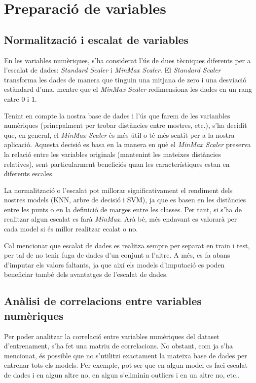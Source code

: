 \section{Preparació de variables}

\subsection{Normalització i escalat de variables}
En les variables numèriques, s'ha considerat l'ús de dues tècniques diferents per a l'escalat de dades: \textit{Standard Scaler} i \textit{MinMax Scaler}. El \textit{Standard Scaler} transforma les dades de manera que tinguin una mitjana de zero i una desviació estàndard d'una, mentre que el \textit{MinMax Scaler} redimensiona les dades en un rang entre 0 i 1.

Tenint en compte la nostra base de dades i l'ús que farem de les varianbles numèriques (princpalment per trobar distàncies entre mostres, etc.), s'ha decidit que, en general, el \textit{MinMax Scaler} és més útil o té més sentit per a la nostra aplicació. Aquesta decisió es basa en la manera en què el \textit{MinMax Scaler} preserva la relació entre les variables originals (mantenint les mateixes distàncies relatives), sent particularment beneficiós quan les característiques estan en diferents escales.

La normalització o l'escalat pot millorar significativament el rendiment dels nostres models (KNN, arbre de decisió i SVM), ja que es basen en les distàncies entre les punts o en la definició de marges entre les classes. Per tant, si s'ha de realitzar algun escalat es farà \textit{MinMax}. Arà bé, més endavant es valorarà per cada model si és millor realitzar ecalat o no.

Cal mencionar que escalat de dades es realitza sempre per separat en train i test, per tal de no tenir fuga de dades d'un conjunt a l'altre. A més, es fa abans d'imputar els valors faltants, ja que així els models d'imputació es poden beneficiar també dels avantatges de l'escalat de dades.

\subsection{Anàlisi de correlacions entre variables numèriques}
Per poder analitzar la correlació entre variables numèriques del dataset d'entrenament, s'ha fet una matriu de correlacions. No obstant, com ja s'ha mencionat, és possible que no s'utilitzi exactament la mateixa base de dades per entrenar tots els models. Per exemple, pot ser que en algun model es faci escalat de dades i en algun altre no, en algun s'eliminin outliers i en un altre no, etc..

